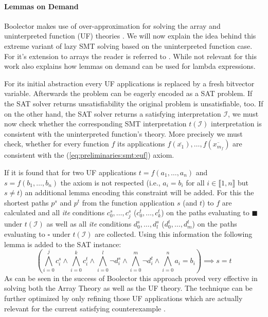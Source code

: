\paragraph{Lemmas on Demand}
Boolector makes use of over-approximation for solving the array \cite{p6-brummayer} and uninterpreted function (UF) theories \cite{PreinerNiemetzBiere-DIFTS13}. We will now explain the idea behind this extreme variant of lazy SMT solving based on the uninterpreted function case. For it's extension to arrays the reader is referred to \cite{p6-brummayer}. While not relevant for this work \cite{PreinerNiemetzBiere-DIFTS13} also explains how lemmas on demand can be used for lambda expressions. 
\par
For its initial abstraction every UF applications is replaced by a fresh bitvector variable. Afterwards the problem can be eagerly encoded as a SAT problem. If the SAT solver returns unsatisfiability the original problem is unsatisfiable, too. If on the other hand, the SAT solver returns a satisfying interpretation $\mathcal{I}$, we must now check whether the corresponding SMT interpretation $t\left(\mathcal{I}\right)$ interpretation is consistent with the uninterpreted function's theory. More precisely we must check, whether for every function $f$ its applications $f\left(\overline{x_1}\right),\dots,f\left(\overline{x_{m_{f}}}\right)$ are consistent with the (\ref{eq:preliminaries:smt:euf}) axiom.
\par
If it is found that for two UF applications $t=f\left(a_1,\dots,a_n\right)$ and $s=f\left(b_1,\dots,b_n\right)$
the axiom is not respected (i.e., $a_i=b_i$ for all $i\in\llbracket1,n\rrbracket$ but $s\neq t$) an additional lemma encoding this constraint will be added. For this the shortest paths $p^s$ and $p^t$ from the function application $s$ (and $t$) to $f$ are calculated and all \textit{ite} conditions $c_0^s,\dots,c_j^s$ ($c_0^t,\dots,c_k^t$) on the paths evaluating to $\blacksquare$ under $t\left(\mathcal{I}\right)$ as well as all \textit{ite} conditions $d_0^s,\dots,d_l^s$ ($d_0^t,\dots,d_m^t$) on the paths evaluating to $\square$ under $t\left(\mathcal{I}\right)$ are collected. Using this information the following lemma is added to the SAT instance:
\[
\left(\bigwedge\limits_{i=0}^{j}c_i^s \land \bigwedge\limits_{i=0}^{k}c_i^t \land \bigwedge\limits_{i=0}^{l} \neg d_i^s \land \bigwedge\limits_{i=0}^{m} \neg d_i^t \land \bigwedge\limits_{i=0}^{n} a_i=b_i \right) \implies s=t
\]
As can be seen in the success of Boolector this approach proved very effective in solving both the Array Theory as well as the UF theory. The technique can be further optimized by only refining those UF applications which are actually relevant for the current satisfying counterexample \cite{NiemetzPreinerBiere-FMCAD14}.

